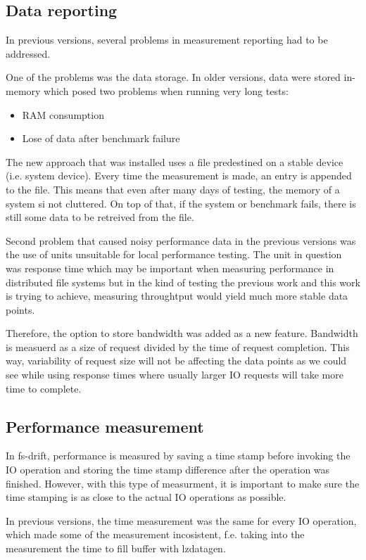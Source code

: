 \documentclass[
  color, %
  table, %
  lof,   %
  lot,   %
]{fithesis3}
\begin{document}
\subsection{Data reporting}
In previous versions, several problems in measurement reporting had to be addressed.

One of the problems was the data storage. In older versions, data were stored in-memory which posed two problems when running very long tests:
\begin{itemize}
    \item RAM consumption
    \item Lose of data after benchmark failure
\end{itemize}

The new approach that was installed uses a file predestined on a stable device (i.e. system device). Every time the measurement is made, an entry is appended to the file. This means that even after many days of testing, the memory of a system si not cluttered. On top of that, if the system or benchmark fails, there is still some data to be retreived from the file.

Second problem that caused noisy performance data in the previous versions was the use of units unsuitable for local performance testing. The unit in question was response time which may be important when measuring performance in distributed file systems but in the kind of testing the previous work and this work is trying to achieve, measuring throughtput would yield much more stable data points.

Therefore, the option to store bandwidth was added as a new feature. Bandwidth is measuerd as a size of request divided by the time of request completion. This way, variability of request size will not be affecting the data points as we could see while using response times where usually larger IO requests will take more time to complete.


\subsection{Performance measurement}
In fs-drift, performance is measured by saving a time stamp before invoking the IO operation and storing the time stamp difference after the operation was finished. However, with this type of measurment, it is important to make sure the time stamping is as close to the actual IO operations as possible. 

In previous versions, the time measurement was the same for every IO operation, which made some of the measurement incosistent, f.e. taking into the measurement the time to fill buffer with lzdatagen.
\end{document}
